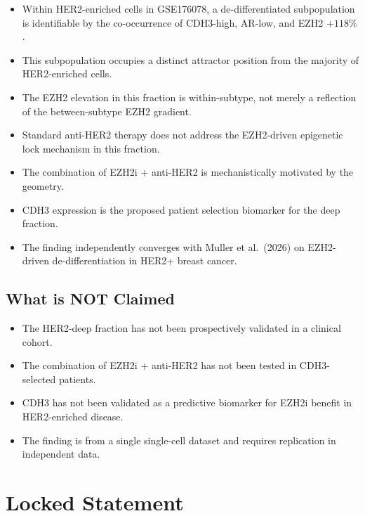 \documentclass[12pt, a4paper]{article}
\begin{document}
\begin{itemize}
    \item Within HER2-enriched cells in
    GSE176078, a de-differentiated
    subpopulation is identifiable by
    the co-occurrence of CDH3-high,
    AR-low, and EZH2 $+118\%$.
    \item This subpopulation occupies a
    distinct attractor position from the
    majority of HER2-enriched cells.
    \item The EZH2 elevation in this
    fraction is within-subtype, not
    merely a reflection of the
    between-subtype EZH2 gradient.
    \item Standard anti-HER2 therapy
    does not address the EZH2-driven
    epigenetic lock mechanism in this
    fraction.
    \item The combination of EZH2i +
    anti-HER2 is mechanistically
    motivated by the geometry.
    \item CDH3 expression is the proposed
    patient selection biomarker for the
    deep fraction.
    \item The finding independently
    converges with Muller et al.\ (2026)
    on EZH2-driven de-differentiation
    in HER2+ breast cancer.
\end{itemize}

\subsection{What is NOT Claimed}

\begin{itemize}
    \item The HER2-deep fraction has not
    been prospectively validated in a
    clinical cohort.
    \item The combination of EZH2i +
    anti-HER2 has not been tested in
    CDH3-selected patients.
    \item CDH3 has not been validated as
    a predictive biomarker for EZH2i
    benefit in HER2-enriched disease.
    \item The finding is from a single
    single-cell dataset and requires
    replication in independent data.
\end{itemize}

\section{Locked Statement}
\end{document}
